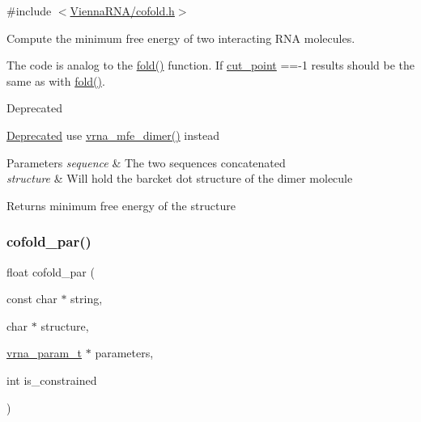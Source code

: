 {\ttfamily \#include $<$\hyperlink{cofold_8h}{Vienna\+R\+N\+A/cofold.\+h}$>$}



Compute the minimum free energy of two interacting R\+NA molecules. 

The code is analog to the \hyperlink{group__mfe__fold__single_gaadafcb0f140795ae62e5ca027e335a9b}{fold()} function. If \hyperlink{fold__vars_8h_ab9b2c3a37a5516614c06d0ab54b97cda}{cut\+\_\+point} ==-\/1 results should be the same as with \hyperlink{group__mfe__fold__single_gaadafcb0f140795ae62e5ca027e335a9b}{fold()}.

\begin{DoxyRefDesc}{Deprecated}
\item[\hyperlink{deprecated__deprecated000030}{Deprecated}]use \hyperlink{group__mfe__cofold_gaab22d10c1190f205f16a77cab9d5d3ee}{vrna\+\_\+mfe\+\_\+dimer()} instead\end{DoxyRefDesc}



\begin{DoxyParams}{Parameters}
{\em sequence} & The two sequences concatenated \\
\hline
{\em structure} & Will hold the barcket dot structure of the dimer molecule \\
\hline
\end{DoxyParams}
\begin{DoxyReturn}{Returns}
minimum free energy of the structure 
\end{DoxyReturn}
\mbox{\label{group__mfe__cofold_ga7612cfeeb1b793f1e4179b1eb53df1f3}} 
\subsubsection{\texorpdfstring{cofold\+\_\+par()}{cofold\_par()}}
{\footnotesize\ttfamily float cofold\+\_\+par (\begin{DoxyParamCaption}\item[{const char $\ast$}]{string,  }\item[{char $\ast$}]{structure,  }\item[{\hyperlink{group__energy__parameters_ga8a69ca7d787e4fd6079914f5343a1f35}{vrna\+\_\+param\+\_\+t} $\ast$}]{parameters,  }\item[{int}]{is\+\_\+constrained }\end{DoxyParamCaption})}



